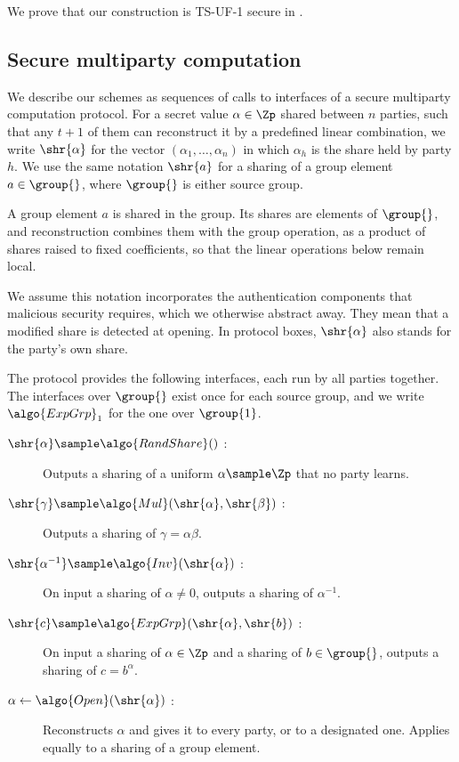We prove that our construction is TS-UF-1 secure in
.

\subsection{Secure multiparty computation}\label{sec:tsps-mpc}

We describe our schemes as sequences of calls to interfaces of a secure
multiparty computation protocol. For a secret value $\alpha \in \Zp$ shared
between $n$ parties, such that any $t+1$ of them can reconstruct it by a
predefined linear combination, we write $\shr{\alpha}$ for the vector
$(\alpha_1, \ldots, \alpha_n)$ in which $\alpha_h$ is the share held by party
$h$. We use the same notation $\shr{a}$ for a sharing of a group element $a \in
\group{}$, where $\group{}$ is either source group.

A group element $a$ is shared in the group. Its shares are
elements of $\group{}$, and reconstruction combines them with the
group operation, as a product of shares raised to fixed coefficients, so that
the linear operations below remain local.

We assume this notation incorporates the authentication components that
malicious security requires, which we otherwise abstract away. They mean that a
modified share is detected at opening. In protocol boxes, $\shr{\alpha}$ also
stands for the party's own share.

The protocol provides the following interfaces, each run by all parties
together. The interfaces over $\group{}$ exist once for each source group, and
we write $\algo{ExpGrp}_1$ for the one over $\group{1}$.

  \begin{description}

    \item[$\shr{\alpha} \sample \algo{RandShare}()$ :] Outputs a sharing of a
uniform $\alpha \sample \Zp$ that no party learns.

    \item[$\shr{\gamma} \sample \algo{Mul}(\shr{\alpha}, \shr{\beta})$ :] Outputs
a sharing of $\gamma = \alpha\beta$.

    \item[$\shr{\alpha^{-1}} \sample \algo{Inv}(\shr{\alpha})$ :] On input a sharing
of $\alpha \neq 0$, outputs a sharing of $\alpha^{-1}$.

    \item[$\shr{c} \sample \algo{ExpGrp}(\shr{\alpha}, \shr{b})$ :] On input a
sharing of $\alpha \in \Zp$ and a sharing of $b \in \group{}$, outputs a sharing
of $c = b^\alpha$.

    \item[$\alpha \leftarrow \algo{Open}(\shr{\alpha})$ :] Reconstructs $\alpha$
and gives it to every party, or to a designated one. Applies equally to a
sharing of a group element.

  \end{description}


